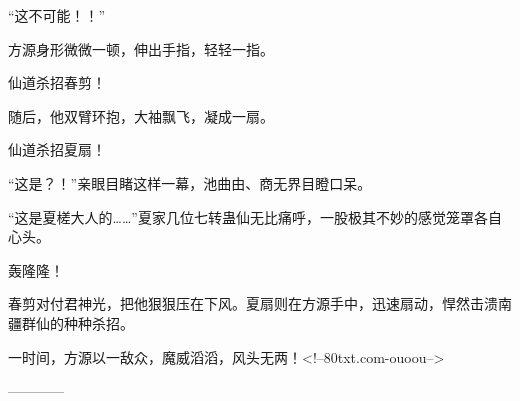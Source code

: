 \begin{this_body}
“这不可能！！”

方源身形微微一顿，伸出手指，轻轻一指。

仙道杀招春剪！

随后，他双臂环抱，大袖飘飞，凝成一扇。

仙道杀招夏扇！

“这是？！”亲眼目睹这样一幕，池曲由、商无界目瞪口呆。

“这是夏槎大人的……”夏家几位七转蛊仙无比痛呼，一股极其不妙的感觉笼罩各自心头。

轰隆隆！

春剪对付君神光，把他狠狠压在下风。夏扇则在方源手中，迅速扇动，悍然击溃南疆群仙的种种杀招。

一时间，方源以一敌众，魔威滔滔，风头无两！<!--80txt.com-ouoou-->

------------

\end{this_body}

